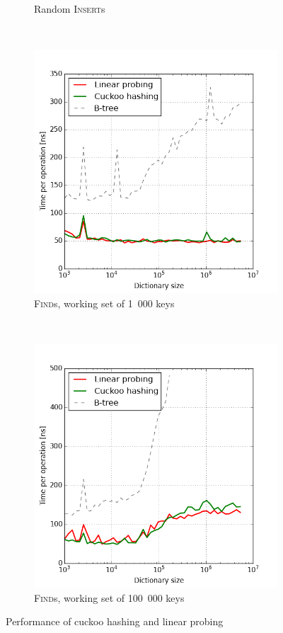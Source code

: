 \begin{figure}
\begin{subfigure}[b]{0.45\textwidth}
	\caption{Random \textsc{Insert}s}
\end{subfigure}
~
\begin{subfigure}[b]{0.45\textwidth}
	\includegraphics[width=\textwidth]{img/performance/hashing-3}
	\caption{\textsc{Find}s, working set of 1~000 keys}
\end{subfigure}
~
\begin{subfigure}[b]{0.45\textwidth}
	\includegraphics[width=\textwidth]{img/performance/hashing-4}
	\caption{\textsc{Find}s, working set of 100~000 keys}
\end{subfigure}
\caption{Performance of cuckoo hashing and linear probing}
\label{fig:hashing-performance}
\end{figure}

